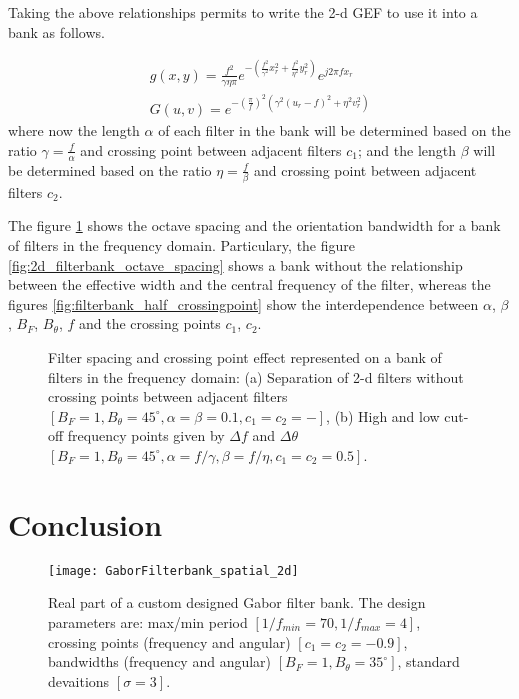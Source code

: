 Taking the above relationships permits to write the 2-d GEF to use it into a bank as follows. 

\begin{equation}\label{eq:gabor_function_2d_spacefreq_bank}
    \begin{gathered}
         g(x,y) =  \frac{f^2}{\gamma \eta \pi} e ^{-\left(\frac{f^2}{\gamma^2} x_r^2 + \frac{f^2}{\eta^2} y_r^2\right)} e ^{j 2 \pi f x_r } \\
         G(u,v) =  e ^{-\left(\frac{\pi}{f}\right)^2\left( \gamma^2 (u_r-f)^2 + \eta^2 v_r^2\right)}
     \end{gathered}
\end{equation}
where now the length $\alpha$ of each filter in the bank will be determined based on the ratio $\gamma = \frac{f}{\alpha}$ and crossing point between adjacent filters $c_1$; and the length $\beta$ will be determined based on the ratio $\eta = \frac{f}{\beta}$ and crossing point between adjacent filters $c_2$.

The figure \ref{fig:2d_filterbank_spacing} shows the octave spacing and the orientation bandwidth for a bank of filters in the frequency domain. Particulary, the figure \ref{fig:2d_filterbank_octave_spacing} shows a bank without the relationship between the effective width and the central frequency of the filter, whereas the figures \ref{fig:filterbank_half_crossingpoint} show the interdependence between $\alpha$, $\beta$, $B_F$, $B_{\theta}$, $f$ and the crossing points $c_1$, $c_2$.

\begin{figure}[!ht]
\centering
\caption{Filter spacing and crossing point effect represented on a bank of filters in the frequency domain: (a) Separation of 2-d filters without crossing points between adjacent filters $[B_F=1, B_{\theta} = 45^{\circ}, \alpha=\beta=0.1, c_1=c_2=-]$, (b) High and low cut-off frequency points given by $\Delta f$ and $\Delta \theta$ $[B_F=1, B_{\theta} = 45^{\circ}, \alpha=f/\gamma, \beta=f/\eta, c_1=c_2=0.5]$.}\label{fig:2d_filterbank_spacing}
\end{figure}

\section{Conclusion}

\begin{figure}[!ht]
\centering
    \texttt{[image: GaborFilterbank\_spatial\_2d]}
    \caption{Real part of a custom designed Gabor filter bank. The design parameters are: max/min period $[1/f_{min}=70, 1/f_{max}=4]$, crossing points (frequency and angular) $[c_1=c_2=-0.9]$, bandwidths (frequency and angular) $[B_F=1, B_{\theta} = 35^{\circ}]$, standard devaitions $[\sigma=3]$.}\label{fig:2d_filterbank}
\end{figure}